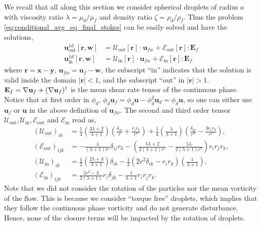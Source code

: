We recall that all along this section we consider spherical droplets of radius $a$ with viscosity ratio $\lambda = \mu_d /\mu_f$ and density ratio $\zeta =\rho_d /\rho_f$. 
Thus the problem \ref{eq:conditional_avg_eq_final_stokes} can be easily solved and have the solutions, 
\begin{align}
    \label{eq:singularity_solution_out}
    \textbf{u}_\text{out}^{1d}[\textbf{r},\textbf{w}]
    &= 
    \mathcal{U}_\text{out}[\textbf{r}] \cdot \textbf{u}_{fw}
    + \mathcal{E}_\text{out}[\textbf{r}]: \textbf{E}_{f}\\
    \textbf{u}_\text{in}^{1d}[\textbf{r},\textbf{w}]
    &= 
    \mathcal{U}_\text{in}[\textbf{r}] \cdot \textbf{u}_{fw}
    + \mathcal{E}_\text{in}[\textbf{r}] : \textbf{E}_{f}
    \label{eq:singularity_solution_in}
\end{align}
where $\textbf{r} = \textbf{x} - \textbf{y}$, $\textbf{u}_{fw} = \textbf{u}_f - \textbf{w}$, the subscript ``in'' indicates that the solution is valid inside the domain $|\textbf{r}| <1$, and the subscript ``out'' in $|\textbf{r}|>1$. 
$\textbf{E}_f = \mathbf{\nabla} \textbf{u}_f + (\mathbf{\nabla} \textbf{u}_f)^\dagger$ is the mean shear rate tensor of the continuous phase. 
Notice that at first order in $\phi_d$, $\phi_d\textbf{u}_f =\phi_d\textbf{u} - \phi_d^2 \textbf{u}_d = \phi_d\textbf{u}$, so one can either use $\textbf{u}_f$ or $\textbf{u}$ in the above definition of $\textbf{u}_{fw}$. 
The second and third order tensor $\mathcal{U}_\text{out},\mathcal{U}_\text{in},\mathcal{E}_\text{out}$ and $\mathcal{E}_\text{in}$ read as, 
\begin{align}
    (\mathcal{U}_{\text{out}})_{ik} &= 
    \frac{1}{4}\left(\frac{3\lambda + 2}{\lambda +1}\right)
    \left(\frac{\delta_{ik}}{r} + \frac{r_ir_k}{r^3}\right) 
    + 
    \frac{1}{4}\left(\frac{\lambda}{\lambda +1}\right)
    \left(\frac{\delta_{ik}}{r^3} - \frac{3r_ir_k}{r^5}\right),  \\
    (\mathcal{E}_{\text{out}})_{ijk}
    &=
    -\frac{\lambda}{(\lambda + 1)r^5} \delta_{ij}r_k
    -\left(\frac{5\lambda +2}{2(\lambda +1 )r^5} - \frac{5\lambda}{2(\lambda+1)r^7}\right) r_ir_jr_k,\\
    (\mathcal{U}_\text{in})_{ik}  &= 
    \frac{1}{2}\left(\frac{2\lambda +3}{\lambda +1}\right)\delta_{ik}
    -\frac{1}{2} (2r^2 \delta_{ik} - r_ir_k)
    \left(\frac{1}{\lambda +1}\right),\\
    (\mathcal{E}_\text{in})_{ijk}
    &=
    \frac{5r^2 -3}{2(\lambda +1)} r_i\delta_{jk}
    - \frac{1}{\lambda+1}r_ir_jr_k. 
\end{align}
Note that we did not consider the rotation of the particles nor the mean vorticity of the flow. 
This is because we consider ``torque free'' droplets, which implies that they follow the continuous phase vorticity and do not generate disturbance. 
Hence, none of the closure terms will be impacted by the rotation of droplets. 

